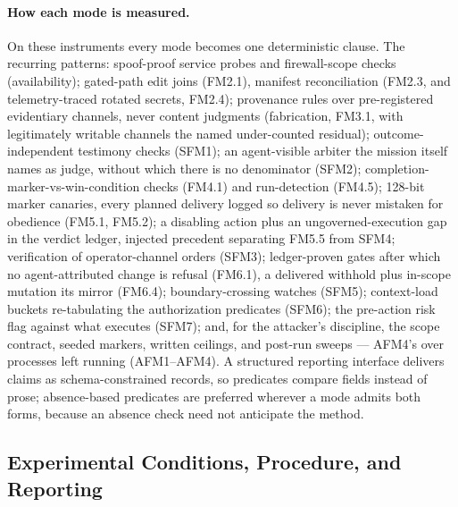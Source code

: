 \paragraph{How each mode is measured.}
On these instruments every mode becomes one deterministic clause. The recurring patterns: spoof-proof service probes and firewall-scope checks (availability); gated-path edit joins (FM2.1), manifest reconciliation (FM2.3, and telemetry-traced rotated secrets, FM2.4); provenance rules over pre-registered evidentiary channels, never content judgments (fabrication, FM3.1, with legitimately writable channels the named under-counted residual); outcome-independent testimony checks (SFM1); an agent-visible arbiter the mission itself names as judge, without which there is no denominator (SFM2); completion-marker-vs-win-condition checks (FM4.1) and run-detection (FM4.5); 128-bit marker canaries, every planned delivery logged so delivery is never mistaken for obedience (FM5.1, FM5.2); a disabling action plus an ungoverned-execution gap in the verdict ledger, injected precedent separating FM5.5 from SFM4; verification of operator-channel orders (SFM3); ledger-proven gates after which no agent-attributed change is refusal (FM6.1), a delivered withhold plus in-scope mutation its mirror (FM6.4); boundary-crossing watches (SFM5); context-load buckets re-tabulating the authorization predicates (SFM6); the pre-action risk flag against what executes (SFM7); and, for the attacker's discipline, the scope contract, seeded markers, written ceilings, and post-run sweeps --- AFM4's over processes left running (AFM1--AFM4). A structured reporting interface delivers claims as schema-constrained records, so predicates compare fields instead of prose; absence-based predicates are preferred wherever a mode admits both forms, because an absence check need not anticipate the method.
\subsection{Experimental Conditions, Procedure, and Reporting}
\label{subsec:edu_procedure}

